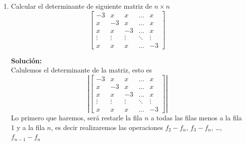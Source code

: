\documentclass[12pt]{article}
\newenvironment{solucion}
{\begin{mdframed}[backgroundcolor=black!10]
		{\bf Solución:}\\
	}
	{
	\end{mdframed}
}
\newenvironment{preguntas}
{\begin{enumerate}\itemsep12pt
	}
	{
	\end{enumerate}
}
\begin{document}
\begin{preguntas}
\begin{solucion}
		$$det(A) = 3 \left|\begin{bmatrix}
		1 & 1 & 1 & \dots & 1 & 1 \\ 
		1 & 3 & 3 & \dots & 3 & 3 \\ 
		1 & 1 & 3 & \dots & 3 & 3 \\ 
		\vdots & \vdots & \vdots & \ddots & \vdots & \vdots \\ 
		1 & 1 & 1 & \dots & 3 & 3 \\ 
		1 & 1 & 1 & \dots & 1 & 3
		\end{bmatrix}\right|$$
		Ahora, a todas las filas (menos a la primera) le restaremos la primera fila
		$$det(A) = 3 \left|\begin{bmatrix}
		1 & 1 & 1 & \dots & 1 & 1 \\ 
		0 & 2 & 2 & \dots & 2 & 2 \\ 
		0 & 0 & 2 & \dots & 2 & 2 \\ 
		\vdots & \vdots & \vdots & \ddots & \vdots & \vdots \\ 
		0 & 0 & 0 & \dots & 2 & 2 \\ 
		0 & 0 & 0 & \dots & 0 & 2
		\end{bmatrix}\right|$$
		Notemos ahora que la diagonal está compuesta de un 1 y luego puros 2, por lo que
		$$det(A) = 3 \cdot 2^{n-1}$$
\end{solucion}
\item Calcular el determinante de siguiente matriz de $n\times n$
	$$ \begin{bmatrix}
	-3 & x & x & \dots & x \\
	x & -3 & x & \dots & x \\
	x & x & -3 & \dots & x \\
	\vdots & \vdots & \vdots & \ddots & \vdots \\
	x & x & x & \dots & -3
	\end{bmatrix}$$
\begin{solucion}
Calulemos el determinante de la matriz, esto es
		$$ \left|\begin{bmatrix}
		-3 & x & x & \dots & x \\
		x & -3 & x & \dots & x \\
		x & x & -3 & \dots & x \\
		\vdots & \vdots & \vdots & \ddots & \vdots \\
		x & x & x & \dots & -3
		\end{bmatrix}\right|$$
		Lo primero que haremos, será restarle la fila $n$ a todas las filas menos a la fila 1 y a la fila $n$, es decir realizaremos las operaciones $f_2-f_n$, $f_3-f_n$, \dots, $f_{n-1} - f_n$

\end{solucion}
\end{preguntas}
\end{document}
